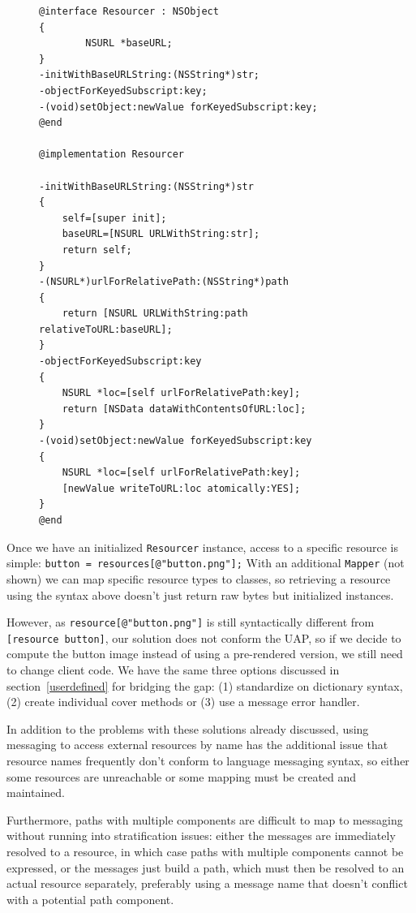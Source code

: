 \documentclass[preprint]{sigplanconf}
\begin{document}
\begin{figure}[htbp]
\begin{lstlisting}[style=numbers,label=resourcer,caption=Resourcer implementation]
@interface Resourcer : NSObject
{
        NSURL *baseURL;
}
-initWithBaseURLString:(NSString*)str;
-objectForKeyedSubscript:key;
-(void)setObject:newValue forKeyedSubscript:key;
@end

@implementation Resourcer

-initWithBaseURLString:(NSString*)str
{
    self=[super init];
    baseURL=[NSURL URLWithString:str];
    return self;
}
-(NSURL*)urlForRelativePath:(NSString*)path
{
    return [NSURL URLWithString:path relativeToURL:baseURL];
}
-objectForKeyedSubscript:key
{
    NSURL *loc=[self urlForRelativePath:key];
    return [NSData dataWithContentsOfURL:loc];
}
-(void)setObject:newValue forKeyedSubscript:key
{
    NSURL *loc=[self urlForRelativePath:key];
    [newValue writeToURL:loc atomically:YES];
}
@end
\end{lstlisting}
\end{figure}

Once we have an initialized {\tt Resourcer} instance, access to a specific resource
is  simple:   {\tt button = resources[@"button.png"];}   With an additional {\tt Mapper}
(not shown) we can map specific resource types to classes, so retrieving a 
resource using the syntax above doesn't just return raw bytes but initialized 
instances.  

However, as {\tt resource[@"button.png"]} is still syntactically different from {\tt [resource button]},
our solution does not conform the UAP, so if we decide to compute the button image instead
of using a pre-rendered version, we still need to change client code.   We have the same three options  discussed
in section~\ref{userdefined} for bridging
the gap:  (1) standardize on dictionary syntax, (2) create individual cover methods or
(3) use a message error handler.  

In addition to the problems with these solutions already discussed,
using messaging to access external resources by name has the additional issue that 
resource names frequently don't conform to language messaging syntax, so either
some resources are unreachable or some mapping must be created and maintained.

Furthermore, paths with multiple components are difficult to map to messaging without
running into stratification issues:  either the messages are immediately resolved to
a resource, in which case paths with multiple components cannot be expressed, or
the messages just build a path, which must then be resolved to an actual resource
separately, preferably using a message name that doesn't conflict with a potential
path component. 
\end{document}

